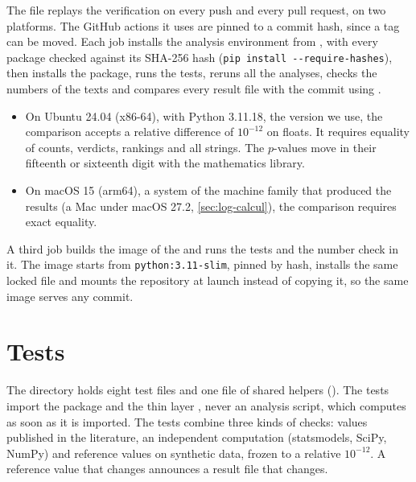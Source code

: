 The file  replays the verification on every push and every pull
request, on two platforms. The GitHub actions it uses are pinned to a commit hash, since a tag can be moved. Each
job installs the analysis environment from , with every package checked
against its SHA-256 hash (\texttt{pip install -{}-require-hashes}), then installs the package, runs
the tests, reruns all the analyses, checks the numbers of the texts and compares every result file
with the commit using .
\begin{itemize}
  \item On Ubuntu 24.04 (x86-64), with Python 3.11.18, the version we use, the comparison
        accepts a relative difference of $10^{-12}$ on floats. It requires equality of counts,
        verdicts, rankings and all strings. The $p$-values move in their fifteenth or sixteenth digit
        with the mathematics library.
  \item On macOS 15 (arm64), a system of the machine family that produced the results (a Mac under
        macOS 27.2, \cref{sec:log-calcul}), the comparison requires exact equality.
\end{itemize}
A third job builds the image of the  and runs the tests and the number check in it.
The image starts from \texttt{python:3.11-slim}, pinned by hash, installs the same locked file and
mounts the repository at launch instead of copying it, so the same image serves any commit.

\section{Tests}
\label{sec:tests}

The  directory holds eight test files and one file of shared helpers
(). The tests import the package and the thin layer ,
never an analysis script, which computes as soon as it is imported. The tests combine three kinds of
checks: values published in the literature, an independent computation (statsmodels, SciPy,
NumPy) and reference values on synthetic data, frozen to a relative $10^{-12}$. A reference value
that changes announces a result file that changes.

